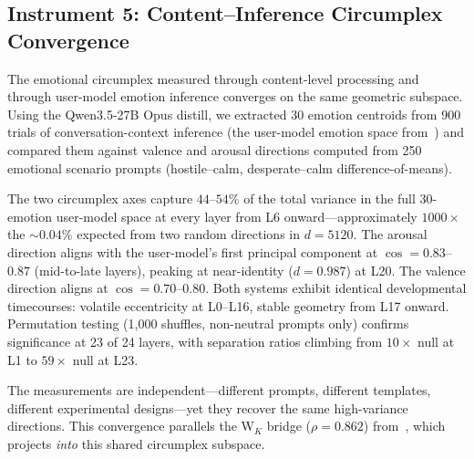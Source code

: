 \subsection{Instrument 5: Content--Inference Circumplex Convergence}

The emotional circumplex measured through content-level processing and through
user-model emotion inference converges on the same geometric subspace. Using the
Qwen3.5-27B Opus distill, we extracted 30 emotion centroids from 900 trials of
conversation-context inference (the user-model emotion space from~\citet{lyra2026weather})
and compared them against valence and arousal directions computed from 250 emotional
scenario prompts (hostile--calm, desperate--calm difference-of-means).

The two circumplex axes capture $44$--$54\%$ of the total variance in the full
30-emotion user-model space at every layer from L6 onward---approximately $1000\times$
the ${\sim}0.04\%$ expected from two random directions in $d{=}5120$. The arousal
direction aligns with the user-model's first principal component at
$\cos = 0.83$--$0.87$ (mid-to-late layers), peaking at near-identity
($d = 0.987$) at L20. The valence direction aligns at
$\cos = 0.70$--$0.80$. %
Both systems exhibit identical developmental timecourses:
volatile eccentricity at L0--L16, stable geometry from L17 onward. Permutation
testing (1{,}000 shuffles, non-neutral prompts only) confirms significance at
23 of 24 layers, with separation ratios climbing from $10\times$ null at L1 to
$59\times$ null at L23.

The measurements are independent---different prompts, different templates, different
experimental designs---yet they recover the same high-variance directions. This
convergence parallels the W$_K$ bridge ($\rho = 0.862$) from~\citet{lyra2026weather},
which projects \emph{into} this shared circumplex subspace.

